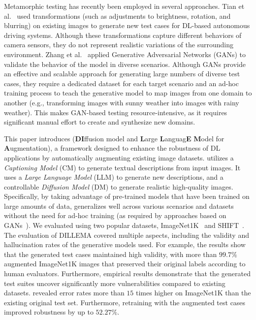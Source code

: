 Metamorphic testing has recently been employed in several approaches. Tian et al.~\cite{DBLP:conf/icse/TianPJR18} used transformations (such as adjustments to brightness, rotation, and blurring) on existing images to generate new test cases for DL-based autonomous driving systems. Although these transformations capture different behaviors of camera sensors, they do not represent realistic variations of the surrounding environment.
Zhang et al.~\cite{DBLP:conf/kbse/ZhangZZ0K18} applied Generative Adversarial Networks (GANs) to validate the behavior of the model in diverse scenarios. Although GANs provide an effective and scalable approach for generating large numbers of diverse test cases, they require a dedicated dataset for each target scenario and an ad-hoc training process to teach the generative model to map images from one domain to another (e.g., transforming images with sunny weather into images with rainy weather). This makes GAN-based testing resource-intensive, as it requires significant manual effort to create and synthesize new domains.

This paper introduces \approach (\textbf{DI}ffusion model and \textbf{L}arge \textbf{L}anguag\textbf{E} \textbf{M}odel for \textbf{A}ugmentation), a framework designed to enhance the robustness of DL applications by automatically augmenting existing image datasets. \approach utilizes a \textit{Captioning Model} (CM) to generate textual descriptions from input images. It uses a \textit{ Large Language Model} (LLM) to generate new descriptions, and a controllable \textit{Diffusion Model} (DM) to generate realistic high-quality images. Specifically, by taking advantage of pre-trained models that have been trained on large amounts of data, \approach generalizes well across various scenarios and datasets without the need for ad-hoc training (as required by approaches based on GANs~\cite{DBLP:conf/kbse/ZhangZZ0K18}).
We evaluated \approach using two popular datasets, ImageNet1K~\cite{DBLP:conf/cvpr/DengDSLL009} and SHIFT~\cite{DBLP:conf/cvpr/SunSPWGSTY22}.
The evaluation of DILLEMA covered multiple aspects, including the validity and hallucination rates of the generative models used. For example, the results show that the generated test cases maintained high validity, with more than $99.7\%$ augmented ImageNet1K images that preserved their original labels according to human evaluators.
Furthermore, empirical results demonstrate that the generated test suites uncover significantly more vulnerabilities compared to existing datasets. \approach revealed error rates more than $15$ times higher on ImageNet1K than the existing original test set. Furthermore, retraining with the augmented test cases improved robustness by up to $52.27\%$. 

